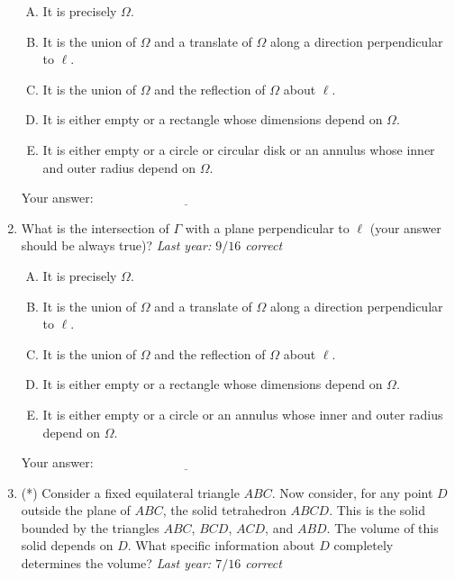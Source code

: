 \documentclass[10pt]{amsart}
\begin{document}
\begin{enumerate}
  \begin{enumerate}[(A)]
  \item It is precisely $\Omega$.
  \item It is the union of $\Omega$ and a translate of $\Omega$ along
    a direction perpendicular to $\ell$.
  \item It is the union of $\Omega$ and the reflection of $\Omega$
    about $\ell$.
  \item It is either empty or a rectangle whose dimensions depend on
    $\Omega$.
  \item It is either empty or a circle or circular disk or an annulus
    whose inner and outer radius depend on $\Omega$.
  \end{enumerate}

  
  \vspace{1in}
Your answer: $\underline{\qquad\qquad\qquad\qquad\qquad\qquad\qquad}$
  \vspace{1in}

\item What is the intersection of $\Gamma$ with a plane perpendicular
  to $\ell$ (your answer should be always true)? {\em Last year:
  $9/16$ correct}

  \begin{enumerate}[(A)]
  \item It is precisely $\Omega$.
  \item It is the union of $\Omega$ and a translate of $\Omega$ along
    a direction perpendicular to $\ell$.
  \item It is the union of $\Omega$ and the reflection of $\Omega$
    about $\ell$.
  \item It is either empty or a rectangle whose dimensions depend on
    $\Omega$.
  \item It is either empty or a circle or an annulus whose inner and
    outer radius depend on $\Omega$.
  \end{enumerate}

  
  \vspace{1in}
Your answer: $\underline{\qquad\qquad\qquad\qquad\qquad\qquad\qquad}$
  \vspace{1in}

\newpage
\item (*) Consider a fixed equilateral triangle $ABC$. Now consider,
  for any point $D$ outside the plane of $ABC$, the solid tetrahedron
  $ABCD$. This is the solid bounded by the triangles $ABC$, $BCD$,
  $ACD$, and $ABD$. The volume of this solid depends on $D$. What
  specific information about $D$ completely determines the volume?
  {\em Last year: $7/16$ correct}


\end{enumerate}
\end{document}
